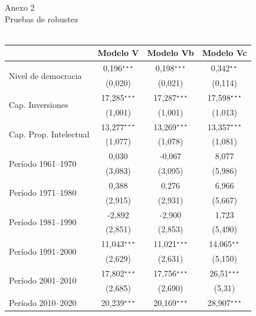 \documentclass[a4paper]{tufte-handout}
\begin{document}
\begin{table}[h]
  \centering
  \selectfont
   \smallskip\noindent\small Anexo 2 \\ Pruebas de robustez \\~\\
  \begin{tabular}{l c c c}
    \toprule
     & Modelo V & Modelo Vb & Modelo Vc \\ \midrule
    \multirow{2}{*}{Nivel de democracia} & 0,196$^{\star\star\star}$ & 0,198$^{\star\star\star}$ & 0,342$^{\star\star}$ \\
    & {\scriptsize (0,020)} & {\scriptsize (0,021)} & {\scriptsize (0,114)} \\ 
    \multirow{2}{*}{Cap. Inversiones} & 17,285$^{\star\star\star}$ & 17,287$^{\star\star\star}$ & 17,598$^{\star\star\star}$ \\
    & {\scriptsize (1,001)} & {\scriptsize (1,001)} & {\scriptsize (1,013)} \\
    \multirow{2}{*}{Cap. Prop. Intelectual} & 13,277$^{\star\star\star}$ & 13,269$^{\star\star\star}$ & 13,357$^{\star\star\star}$ \\
    & {\scriptsize (1,077)} & {\scriptsize (1,078)} & {\scriptsize (1,081)}\\
    \multirow{2}{*}{Período 1961--1970} & 0,030 & -0,067 & 8,077 \\
    & {\scriptsize (3,083)} & {\scriptsize (3,095)} & {\scriptsize (5,986)} \\
    \multirow{2}{*}{Período 1971--1980} & 0,388 & 0,276 & 6,966 \\
    & {\scriptsize (2,915)} & {\scriptsize (2,931)} & {\scriptsize (5,667)} \\
    \multirow{2}{*}{Período  1981--1990} & -2,892 & -2,900 & 1,723 \\
    & {\scriptsize (2,851)} & {\scriptsize (2,853)} & {\scriptsize (5,490)} \\
    \multirow{2}{*}{Período 1991--2000} & 11,043$^{\star\star\star}$ & 11,021$^{\star\star\star}$  & 14,065$^{\star\star}$ \\
    & {\scriptsize (2,629)} & {\scriptsize (2,631)} & {\scriptsize (5,150)} \\ 
    \multirow{2}{*}{Período  2001--2010} & 17,802$^{\star\star\star}$ & 17,756$^{\star\star\star}$ & 26,51$^{\star\star\star}$ \\
    & {\scriptsize (2,685)} & {\scriptsize (2,690)} & {\scriptsize (5,31)} \\ 
    \multirow{2}{*}{Período 2010--2020} & 20,239$^{\star\star\star}$ & 20,169$^{\star\star\star}$ & 28,907$^{\star\star\star}$ \\

\end{tabular}
\end{table}
\end{document}
